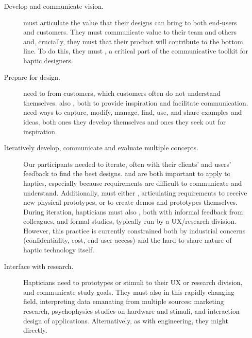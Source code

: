 \begin{description}
    \item[Develop and communicate vision.]
     must articulate the value that their designs can bring to both end-users and customers.
    They must communicate value to their team and others and, crucially, %
    they must  that their product will contribute to the bottom line.
    To do this, they must , a critical part of the communicative toolkit for haptic designers.
    
    \item[Prepare for design.]  need to  from customers, which customers often do not understand themselves.
     also , both to provide inspiration and facilitate communication.
     need ways to capture, modify, manage, find, use, and share examples and ideas, both ones they develop themselves and ones they seek out for inspiration. 
    
    
    \item[Iteratively develop, communicate and evaluate multiple concepts.]
    Our participants needed to iterate, often with their clients' and users' feedback to find the best designs.
     and  %
    are both important to apply to haptics, especially because requirements are difficult to communicate and understand.
    Additionally,  must either ,
    articulating requirements to receive new physical prototypes, or  to create demos and prototypes themselves.
    During iteration, hapticians must also ,
    both with informal feedback from colleagues, and formal studies, typically run by a UX/research division.
    However, this practice is currently constrained both by industrial concerns (confidentiality, cost, end-user access) and the hard-to-share nature of haptic technology itself.
    
    \item[Interface with research.]
    Hapticians need to  prototypes or stimuli to their UX or research division, and communicate study goals.
    They must also  in this rapidly changing field, interpreting data emanating from multiple sources: marketing research, psychophysics studies on hardware and stimuli, and interaction design of applications. 
    Alternatively, as with engineering, they might   directly.
    

\end{description}
